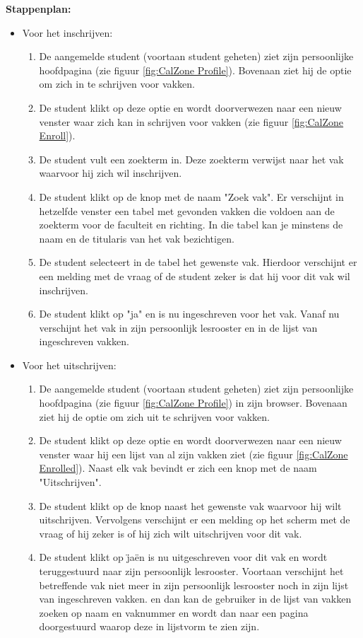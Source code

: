 \textbf{Stappenplan:}
\begin{itemize}
\item Voor het inschrijven:
	\begin{enumerate}
	\item De aangemelde student (voortaan student geheten) ziet zijn persoonlijke hoofdpagina (zie figuur \ref{fig:CalZone Profile}). Bovenaan ziet hij de optie om zich in te schrijven voor vakken.
	\item De student klikt op deze optie en wordt doorverwezen naar een nieuw venster waar zich kan in schrijven voor vakken (zie figuur \ref{fig:CalZone Enroll}).
	\item De student vult een zoekterm in. Deze zoekterm verwijst naar het vak waarvoor hij zich wil inschrijven. 
	\item De student klikt op de knop met de naam "Zoek vak". Er verschijnt in hetzelfde venster een tabel met gevonden vakken die voldoen aan de zoekterm voor de faculteit en richting. In die tabel kan je minstens de naam en de titularis van het vak bezichtigen.
	\item De student selecteert in de tabel het gewenste vak. Hierdoor verschijnt er een melding met de vraag of de student zeker is dat hij voor dit vak wil inschrijven.
	\item De student klikt op "ja" en is nu ingeschreven voor het vak. Vanaf nu verschijnt het vak in zijn persoonlijk lesrooster en in de lijst van ingeschreven vakken.
	\end{enumerate}
	
\item Voor het uitschrijven:
	\begin{enumerate}
	\item De aangemelde student (voortaan student geheten) ziet zijn persoonlijke hoofdpagina (zie figuur \ref{fig:CalZone Profile}) in zijn browser. Bovenaan ziet hij de optie om zich uit te schrijven voor vakken.
	\item De student klikt op deze optie en wordt doorverwezen naar een nieuw venster waar hij een lijst van al zijn vakken ziet (zie figuur \ref{fig:CalZone Enrolled}). Naast elk vak bevindt er zich een knop met de naam "Uitschrijven".
	\item De student klikt op de knop naast het gewenste vak waarvoor hij wilt uitschrijven. Vervolgens verschijnt er een melding op het scherm met de vraag of hij zeker is of hij zich wilt uitschrijven voor dit vak.
	\item De student klikt op \"ja\" en is nu uitgeschreven voor dit vak en wordt teruggestuurd naar zijn persoonlijk lesrooster. Voortaan verschijnt het betreffende vak niet meer in zijn persoonlijk lesrooster noch in zijn lijst van ingeschreven vakken. en dan kan de gebruiker in de lijst van vakken zoeken op naam en vaknummer en wordt dan naar een pagina doorgestuurd waarop deze in lijstvorm te zien zijn.
	\end{enumerate}
\end{itemize}

